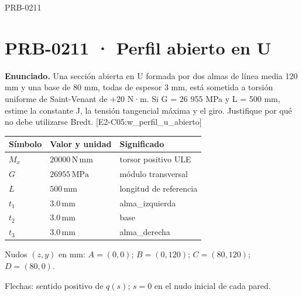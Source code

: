 \Needspace{.3\textheight}

\begin{studiumworked}{PRB-0211}

\section{PRB-0211 · Perfil abierto en U}

\textbf{Enunciado.} Una sección abierta en U formada por dos almas de línea media 120 mm y una base de 80 mm, todas de espesor 3 mm, está sometida a torsión uniforme de Saint-Venant de +20 N·m. Si G = 26 955 MPa y L = 500 mm, estime la constante J, la tensión tangencial máxima y el giro. Justifique por qué no debe utilizarse Bredt. [E2-C05:w\_perfil\_u\_abierto]

\par\medskip\noindent\begin{tabular}{@{}p{.18\linewidth}p{.26\linewidth}p{.48\linewidth}@{}}
\toprule Símbolo & Valor y unidad & Significado\\\midrule
$M_{x}$ & $20000\,\mathrm{N\,mm}$ & torsor positivo ULE\\
$G$ & $26955\,\mathrm{MPa}$ & módulo transversal\\
$L$ & $500\,\mathrm{mm}$ & longitud de referencia\\
$t_{1}$ & $3.0\,\mathrm{mm}$ & alma\_izquierda\\
$t_{2}$ & $3.0\,\mathrm{mm}$ & base\\
$t_{3}$ & $3.0\,\mathrm{mm}$ & alma\_derecha\\
\bottomrule\end{tabular}\par\medskip

\par\medskip\noindent\begin{minipage}{\linewidth}\centering
{}
\par\small Nudos $(z,y)$ en mm: $A=(0,0)$; $B=(0,120)$; $C=(80,120)$; $D=(80,0)$.
\par\small Flechas: sentido positivo de $q(s)$; $s=0$ en el nudo inicial de cada pared.
\par\normalsize\end{minipage}\par\medskip


\end{studiumworked}

